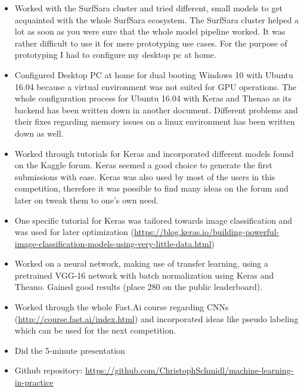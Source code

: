\documentclass[a4paper]{article}
\begin{document}
\begin{itemize}
	\item Worked with the SurfSara cluster and tried different, small models to get acquainted with the whole SurfSara ecosystem. The SurfSara cluster helped a lot as soon as you were sure that the whole model pipeline worked. It was rather difficult to use it for mere prototyping use cases. For the purpose of prototyping I had to configure my desktop pc at home.
	
	\item Configured Desktop PC at home for dual booting Windows 10 with Ubuntu 16.04 because a virtual environment was not suited for GPU operations. The whole configuration process for Ubuntu 16.04 with Keras and Thenao as its backend has been written down in another document. Different problems and their fixes regarding memory issues on a linux environment has been written down as well.
	
	\item Worked through tutorials for Keras and incorporated different models found on the Kaggle forum. Keras seemed a good choice to generate the first submissions with ease. Keras was also used by most of the users in this competition, therefore it was possible to find many ideas on the forum and later on tweak them to one’s own need.
	
	\item One specific tutorial for Keras was tailored towards image classification and was used for later optimization (\url{https://blog.keras.io/building-powerful-image-classification-models-using-very-little-data.html})
	
	\item Worked on a neural network, making use of transfer learning, using a pretrained VGG-16 network with batch normalization using Keras and Theano. Gained good results (place 280 on the public leaderboard).
	
	\item Worked through the whole Fast.Ai course regarding CNNs (\url{http://course.fast.ai/index.html}) and incorporated ideas like pseudo labeling which can be used for the next competition.
	
	\item Did the 5-minute presentation
	\item Github repository: \url{https://github.com/ChristophSchmidl/machine-learning-in-practice}
\end{itemize}
\vspace{1em}
\end{document}
